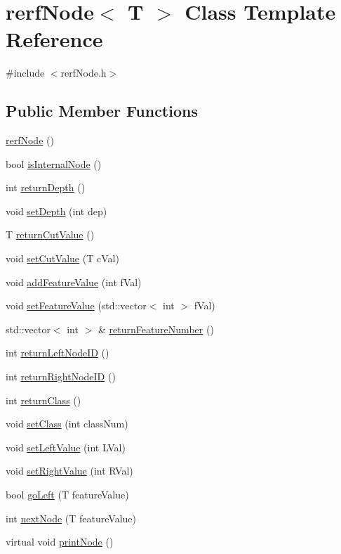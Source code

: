 \hypertarget{classrerfNode}{}\section{rerf\+Node$<$ T $>$ Class Template Reference}
\label{classrerfNode}


{\ttfamily \#include $<$rerf\+Node.\+h$>$}

\subsection*{Public Member Functions}
\begin{DoxyCompactItemize}
\item 
\hyperlink{classrerfNode_a22e89eb08a352567b5880f40b167ced8}{rerf\+Node} ()
\item 
bool \hyperlink{classrerfNode_ace2de533e796bc163c5da0b183746e69}{is\+Internal\+Node} ()
\item 
int \hyperlink{classrerfNode_a6b6d6f3a3e754e680b1a8801ed7d10c8}{return\+Depth} ()
\item 
void \hyperlink{classrerfNode_a5fe73086780accca796a8e2b2465ac39}{set\+Depth} (int dep)
\item 
T \hyperlink{classrerfNode_a24e784c2f3b958ca6f48be08b2d4a0de}{return\+Cut\+Value} ()
\item 
void \hyperlink{classrerfNode_a0cdc84a6c6cc7544e0a71525b8688c8d}{set\+Cut\+Value} (T c\+Val)
\item 
void \hyperlink{classrerfNode_a118ca4701cbeaefe6059d26df05bb912}{add\+Feature\+Value} (int f\+Val)
\item 
void \hyperlink{classrerfNode_aa3253da3948adeffa9a908caa339f396}{set\+Feature\+Value} (std\+::vector$<$ int $>$ f\+Val)
\item 
std\+::vector$<$ int $>$ \& \hyperlink{classrerfNode_aa51d1f5df455856bda7af94f1799760f}{return\+Feature\+Number} ()
\item 
int \hyperlink{classrerfNode_ad6ff2fef3621b52280f1bb2b3e9f23d5}{return\+Left\+Node\+ID} ()
\item 
int \hyperlink{classrerfNode_a0f183e7683ebd7683f003db3eaa9a4a6}{return\+Right\+Node\+ID} ()
\item 
int \hyperlink{classrerfNode_a48a5c0d5ae3fd5f59791065f5bc54367}{return\+Class} ()
\item 
void \hyperlink{classrerfNode_af150e653daddcde22261e3e12ebc2986}{set\+Class} (int class\+Num)
\item 
void \hyperlink{classrerfNode_a1de908ea051d4845ca00296d42c7ae80}{set\+Left\+Value} (int L\+Val)
\item 
void \hyperlink{classrerfNode_a9561bbd59f5aa7b2beef6d520d89d4ad}{set\+Right\+Value} (int R\+Val)
\item 
bool \hyperlink{classrerfNode_a69984008dbb0c64dc8553c45b1d85d2d}{go\+Left} (T feature\+Value)
\item 
int \hyperlink{classrerfNode_aa2a1f7dceca7652d28a60c872b3351cf}{next\+Node} (T feature\+Value)
\item 
virtual void \hyperlink{classrerfNode_afc097136492957d5cd96269addcfb413}{print\+Node} ()
\end{DoxyCompactItemize}
